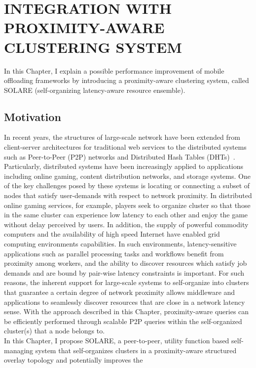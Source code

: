 \chapter{INTEGRATION WITH PROXIMITY-AWARE CLUSTERING SYSTEM}
\label{chap:solare}
In this Chapter, I explain a possible performance improvement of mobile
offloading frameworks by introducing a proximity-aware clustering system,
called SOLARE (self-organizing latency-aware resource ensemble).
%

\section{Motivation}
\label{solare:motivation}
In recent years, the structures of large-scale network have been
extended from client-server architectures for traditional web services
to the distributed systems such as Peer-to-Peer (P2P) networks and
Distributed Hash Tables (DHTs)~\cite{chord, can, tapestry}.
%
Particularly, distributed systems have been increasingly applied to
applications including online gaming, content distribution networks, and
storage systems.
%
One of the key challenges posed by these systems is locating or
connecting a subset of nodes that satisfy user-demands with respect to
network proximity.
%
In distributed online gaming services, for example, players seek to
organize cluster so that those in the same cluster can experience low
latency to each other and enjoy the game without delay perceived by
users.
%
In addition, the supply of powerful commodity computers and the
availability of high speed Internet have enabled grid computing
environments capabilities.
%
In such environments, latency-sensitive applications such as parallel
processing tasks and workflows benefit from proximity among workers, and
the ability to discover resources which satisfy job demands and are
bound by pair-wise latency constraints is important.
%
For such reasons, the inherent support for large-scale systems to
self-organize into clusters that guarantee a certain degree of network
proximity allows middleware and applications to seamlessly discover
resources that are close in a network latency sense.
%
With the approach described in this Chapter, proximity-aware queries can
be efficiently performed through scalable P2P queries within the
self-organized cluster(s) that a node belongs to.\\
%
In this Chapter, I propose SOLARE, a peer-to-peer, utility function
based self-managing system that self-organizes clusters in a
proximity-aware structured overlay topology and potentially improves the
